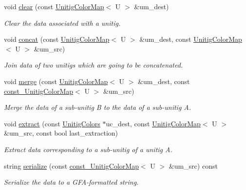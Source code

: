 \begin{DoxyCompactItemize}
\item 
void \hyperlink{classCCDBG__Data__t_adcdd42b81067d6095534f53b09c24aac}{clear} (const \hyperlink{classUnitigMap}{Unitig\+Color\+Map}$<$ U $>$ \&um\+\_\+dest)
\begin{DoxyCompactList}\small\item\em Clear the data associated with a unitig. \end{DoxyCompactList}\item 
void \hyperlink{classCCDBG__Data__t_a0ce6821deb4441f8a7dd3d270ed8b3a6}{concat} (const \hyperlink{classUnitigMap}{Unitig\+Color\+Map}$<$ U $>$ \&um\+\_\+dest, const \hyperlink{classUnitigMap}{Unitig\+Color\+Map}$<$ U $>$ \&um\+\_\+src)
\begin{DoxyCompactList}\small\item\em Join data of two unitigs which are going to be concatenated. \end{DoxyCompactList}\item 
void \hyperlink{classCCDBG__Data__t_af358cb00cd1aa29b90780d8c065954e8}{merge} (const \hyperlink{classUnitigMap}{Unitig\+Color\+Map}$<$ U $>$ \&um\+\_\+dest, const \hyperlink{classUnitigMap}{const\+\_\+\+Unitig\+Color\+Map}$<$ U $>$ \&um\+\_\+src)
\begin{DoxyCompactList}\small\item\em Merge the data of a sub-\/unitig B to the data of a sub-\/unitig A. \end{DoxyCompactList}\item 
void \hyperlink{classCCDBG__Data__t_a45794343781dc4e482537125f26ef61f}{extract} (const \hyperlink{classUnitigColors}{Unitig\+Colors} $\ast$uc\+\_\+dest, const \hyperlink{classUnitigMap}{Unitig\+Color\+Map}$<$ U $>$ \&um\+\_\+src, const bool last\+\_\+extraction)
\begin{DoxyCompactList}\small\item\em Extract data corresponding to a sub-\/unitig of a unitig A. \end{DoxyCompactList}\item 
string \hyperlink{classCCDBG__Data__t_ab29386cdf5ae12239c0a87d510f7aa40}{serialize} (const \hyperlink{classUnitigMap}{const\+\_\+\+Unitig\+Color\+Map}$<$ U $>$ \&um\+\_\+src) const
\begin{DoxyCompactList}\small\item\em Serialize the data to a G\+F\+A-\/formatted string. \end{DoxyCompactList}\end{DoxyCompactItemize}



